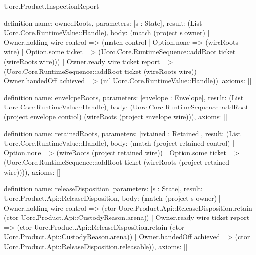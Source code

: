 \begin{lexlean}{Uorc.Product.InspectionReport}
\begin{semanticmodule}
definition{
  name: ownedRoots,
  parameters: [s : State],
  result: (List Uorc.Core.RuntimeValue::Handle),
  body: (match (project s owner)
    | Owner.holding wire control => (match control
      | Option.none => (wireRoots wire)
      | Option.some ticket => (Uorc.Core.RuntimeSequence::addRoot ticket (wireRoots wire)))
    | Owner.ready wire ticket report => (Uorc.Core.RuntimeSequence::addRoot ticket (wireRoots wire))
    | Owner.handedOff achieved => (nil Uorc.Core.RuntimeValue::Handle)),
  axioms: []
}

definition{
  name: envelopeRoots,
  parameters: [envelope : Envelope],
  result: (List Uorc.Core.RuntimeValue::Handle),
  body: (Uorc.Core.RuntimeSequence::addRoot (project envelope control) (wireRoots (project envelope wire))),
  axioms: []
}

definition{
  name: retainedRoots,
  parameters: [retained : Retained],
  result: (List Uorc.Core.RuntimeValue::Handle),
  body: (match (project retained control)
    | Option.none => (wireRoots (project retained wire))
    | Option.some ticket => (Uorc.Core.RuntimeSequence::addRoot ticket (wireRoots (project retained wire)))),
  axioms: []
}

definition{
  name: releaseDisposition,
  parameters: [s : State],
  result: Uorc.Product.Api::ReleaseDisposition,
  body: (match (project s owner)
    | Owner.holding wire control => (ctor Uorc.Product.Api::ReleaseDisposition.retain (ctor Uorc.Product.Api::CustodyReason.arena))
    | Owner.ready wire ticket report => (ctor Uorc.Product.Api::ReleaseDisposition.retain (ctor Uorc.Product.Api::CustodyReason.arena))
    | Owner.handedOff achieved => (ctor Uorc.Product.Api::ReleaseDisposition.releasable)),
  axioms: []
}
\end{semanticmodule}
\end{lexlean}
